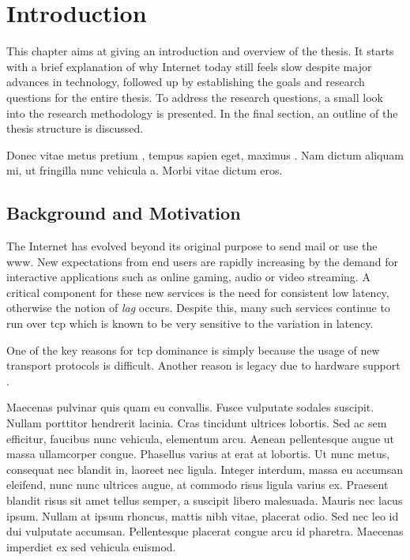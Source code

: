 \chapter{Introduction}

This chapter aims at giving an introduction and overview of the thesis. It starts with a brief explanation of why Internet today still feels slow despite major advances in technology, followed up by establishing the goals and research questions for the entire thesis. To address the research questions, a small look into the research methodology is presented. In the final section, an outline of the thesis structure is discussed.

Donec vitae metus pretium \cite{abe}, tempus sapien eget, maximus . Nam dictum aliquam mi, ut fringilla nunc vehicula a. Morbi vitae dictum eros.

\section{Background and Motivation}

The Internet has evolved beyond its original purpose to send mail or use the \gls{www}. New expectations from end users are rapidly increasing by the demand for interactive applications such as online gaming, audio or video streaming. A critical component for these new services is the need for consistent low latency, otherwise the notion of \textit{lag} occurs. Despite this, many such services continue to run over \gls{tcp} which is known to be very sensitive to the variation in latency.

One of the key reasons for \gls{tcp} dominance is simply because the usage of new transport protocols is difficult. Another reason is legacy due to hardware support . 


Maecenas pulvinar quis quam eu convallis. Fusce vulputate sodales suscipit. Nullam porttitor hendrerit lacinia. Cras tincidunt ultrices lobortis. Sed ac sem efficitur, faucibus nunc vehicula, elementum arcu. Aenean pellentesque augue ut massa ullamcorper congue. Phasellus varius at erat at lobortis. Ut nunc metus, consequat nec blandit in, laoreet nec ligula. Integer interdum, massa eu accumsan eleifend, nunc nunc ultrices augue, at commodo risus ligula varius ex. Praesent blandit risus sit amet tellus semper, a suscipit libero malesuada. Mauris nec lacus ipsum. Nullam at ipsum rhoncus, mattis nibh vitae, placerat odio. Sed nec leo id dui vulputate accumsan. Pellentesque placerat congue arcu id pharetra. Maecenas imperdiet ex sed vehicula euismod.

